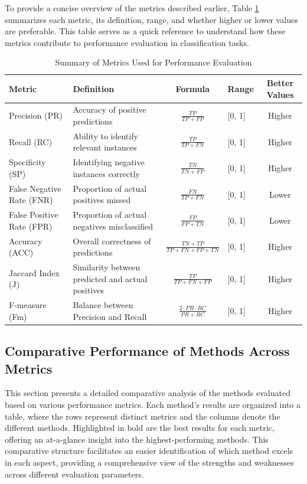 \documentclass{article}
\begin{document}
To provide a concise overview of the metrics described earlier, Table \ref{tab:metrics_summary} summarizes each metric, its definition, range, and whether higher or lower values are preferable. This table serves as a quick reference to understand how these metrics contribute to performance evaluation in classification tasks.


\renewcommand{\arraystretch}{1.5} %
\begin{table}[H]
	\centering
	\caption{Summary of Metrics Used for Performance Evaluation}
	\label{tab:metrics_summary}
	\vspace{0.4cm}
	\begin{tabular}{@{}p{3cm}p{4cm}c p{2cm}c@{}}
		\toprule
		\textbf{Metric} & \textbf{Definition} & \textbf{Formula} & \textbf{Range} & \textbf{Better Values} \\ 
		\midrule
		Precision (PR) & Accuracy of positive predictions & $\frac{TP}{TP + FP}$ & [0, 1] & Higher \\ 
		Recall (RC) & Ability to identify relevant instances & $\frac{TP}{TP + FN}$ & [0, 1] & Higher \\ 
		Specificity (SP) & Identifying negative instances correctly & $\frac{TN}{TN + FP}$ & [0, 1] & Higher \\ 
		False Negative Rate (FNR) & Proportion of actual positives missed & $\frac{FN}{TP + FN}$ & [0, 1] & Lower \\ 
		False Positive Rate (FPR) & Proportion of actual negatives misclassified & $\frac{FP}{FP + TN}$ & [0, 1] & Lower \\ 
		Accuracy (ACC) & Overall correctness of predictions & $\frac{TN + TP}{TP + FN + FP + TN}$ & [0, 1] & Higher \\ 
		Jaccard Index (J) & Similarity between predicted and actual positives & $\frac{TP}{TP + FN + FP}$ & [0, 1] & Higher \\ 
		F-measure (Fm) & Balance between Precision and Recall & $\frac{2 \cdot PR \cdot RC}{PR + RC}$ & [0, 1] & Higher \\ 
		\bottomrule
	\end{tabular}
\end{table}

\subsection{Comparative Performance of Methods Across Metrics}

This section presents a detailed comparative analysis of the methods evaluated based on various performance metrics. Each method's results are organized into a table, where the rows represent distinct metrics and the columns denote the different methods. Highlighted in bold are the best results for each metric, offering an at-a-glance insight into the highest-performing methods. This comparative structure facilitates an easier identification of which method excels in each aspect, providing a comprehensive view of the strengths and weaknesses across different evaluation parameters.
\\
\end{document}
